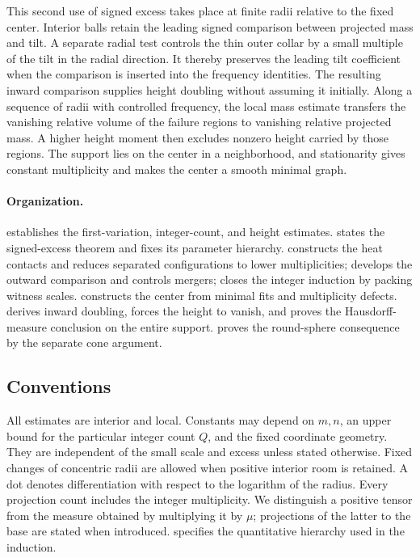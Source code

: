 This second use of signed excess takes place at finite radii relative to
the fixed center. Interior balls retain the leading signed comparison
between projected mass and tilt. A separate radial test controls the thin
outer collar by a small multiple of the tilt in the radial direction.
It thereby preserves the leading tilt coefficient when the comparison is
inserted into the frequency identities. The resulting inward comparison
supplies height doubling without assuming it initially. Along a sequence
of radii with controlled frequency, the local mass estimate transfers the
vanishing relative volume of the failure regions to vanishing relative
projected mass. A higher height moment then
excludes nonzero height carried by those regions. The support lies on
the center in a neighborhood, and
stationarity gives constant multiplicity and makes the center a smooth
minimal graph.

\paragraph{Organization.}
 establishes the first-variation, integer-count, and height
estimates.  states the signed-excess theorem and
fixes its parameter hierarchy.  constructs the heat
contacts and reduces separated configurations to lower multiplicities;
 develops the outward comparison and controls mergers;
 closes the integer induction by packing witness scales.
 constructs the center from minimal fits and
multiplicity defects.  derives inward doubling,
forces the height to vanish, and proves the Hausdorff-measure conclusion
on the entire support.  proves the round-sphere
consequence by the separate cone argument.

\subsection{Conventions}

All estimates are interior and local. Constants may depend on $m,n$, an upper
bound for the particular integer count $Q$, and the fixed coordinate geometry.
They are independent of the small scale and excess unless stated otherwise.
Fixed changes of concentric radii are allowed when positive interior room is
retained. A dot denotes differentiation with respect to the logarithm of the
radius. Every projection count includes the integer multiplicity.
We distinguish a positive tensor from the measure obtained by multiplying it
by $\mu$; projections of the latter to the base are stated when introduced.
 specifies the quantitative hierarchy used in the
induction.
